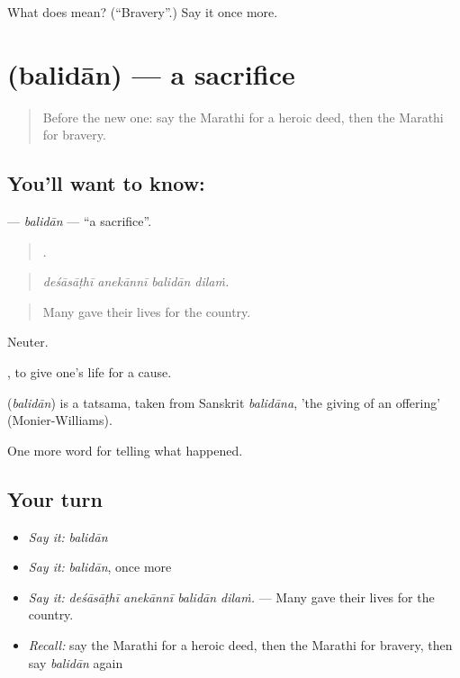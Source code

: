 \begin{tcolorbox}[breakable,colback=teal!4,colframe=teal!35!black,title={Before you move on}]
What does  mean? (\textquotedblleft{}Bravery\textquotedblright{}.) Say it once more.
\end{tcolorbox}
\section[\texorpdfstring{\mr{बलिदान} (balidān)}{बलिदान (balidān)}]{ (balidān) — a sacrifice}

\label{lesson:MR-C332-balidan}



\begin{quote}
Before the new one: say the Marathi for a heroic deed, then the Marathi for bravery.
\end{quote}

\subsection*{You'll want to know: }
\textbf{} — \emph{balidān} — \textquotedblleft{}a sacrifice\textquotedblright{}.

\begin{quote}
   .
\end{quote}

\begin{quote}
\emph{deśāsāṭhī anekānnī balidān dilaṁ.}
\end{quote}

\begin{quote}
Many gave their lives for the country.
\end{quote}

Neuter.

 , to give one's life for a cause.

\begin{cousinweb}
\textbf{} (\emph{balidān}) is a tatsama, taken from Sanskrit \emph{balidāna}, 'the giving of an offering' (Monier-Williams).
\end{cousinweb}

\begin{grammarlens}[title={What you've built}]
One more word for telling what happened.
\end{grammarlens}

\subsection*{Your turn}
\begin{itemize}
\raggedright
  \item \emph{Say it:} \emph{balidān}
  \item \emph{Say it:} \emph{balidān}, once more
  \item \emph{Say it:} \emph{deśāsāṭhī anekānnī balidān dilaṁ.} — Many gave their lives for the country.
  \item \emph{Recall:} say the Marathi for a heroic deed, then the Marathi for bravery, then say \emph{balidān} again
\end{itemize}

